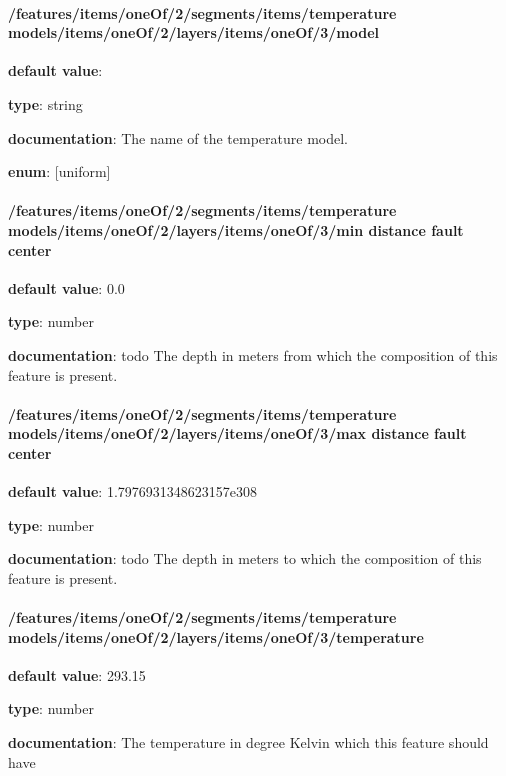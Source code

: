 \paragraph{/features/items/oneOf/2/segments/items/temperature models/items/oneOf/2/layers/items/oneOf/3/model} \begin{itemized}
\item {\bf default value}: 
\item {\bf type}: string
\item {\bf documentation}: The name of the temperature model.
\item {\bf enum}: [uniform]\end{itemized}\paragraph{/features/items/oneOf/2/segments/items/temperature models/items/oneOf/2/layers/items/oneOf/3/min distance fault center} \begin{itemized}
\item {\bf default value}: 0.0
\item {\bf type}: number
\item {\bf documentation}: todo The depth in meters from which the composition of this feature is present.
\end{itemized}\paragraph{/features/items/oneOf/2/segments/items/temperature models/items/oneOf/2/layers/items/oneOf/3/max distance fault center} \begin{itemized}
\item {\bf default value}: 1.7976931348623157e308
\item {\bf type}: number
\item {\bf documentation}: todo The depth in meters to which the composition of this feature is present.
\end{itemized}\paragraph{/features/items/oneOf/2/segments/items/temperature models/items/oneOf/2/layers/items/oneOf/3/temperature} \begin{itemized}
\item {\bf default value}: 293.15
\item {\bf type}: number
\item {\bf documentation}: The temperature in degree Kelvin which this feature should have

\end{itemized}
